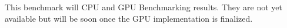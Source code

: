 This benchmark will CPU and GPU Benchmarking results. They are not yet available but will be soon once the GPU implementation is finalized.

%
%
%
%

